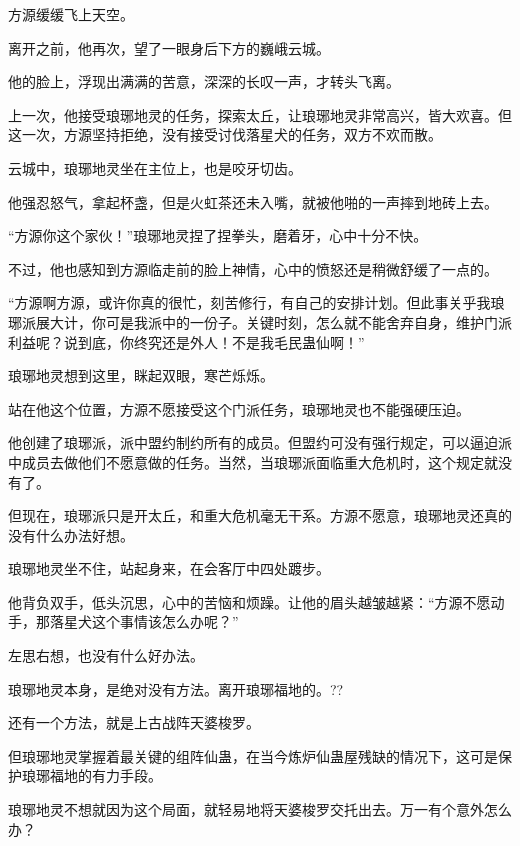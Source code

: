 
\begin{this_body}



方源缓缓飞上天空。

离开之前，他再次，望了一眼身后下方的巍峨云城。

他的脸上，浮现出满满的苦意，深深的长叹一声，才转头飞离。

上一次，他接受琅琊地灵的任务，探索太丘，让琅琊地灵非常高兴，皆大欢喜。但这一次，方源坚持拒绝，没有接受讨伐落星犬的任务，双方不欢而散。

云城中，琅琊地灵坐在主位上，也是咬牙切齿。

他强忍怒气，拿起杯盏，但是火虹茶还未入嘴，就被他啪的一声摔到地砖上去。

“方源你这个家伙！”琅琊地灵捏了捏拳头，磨着牙，心中十分不快。

不过，他也感知到方源临走前的脸上神情，心中的愤怒还是稍微舒缓了一点的。

“方源啊方源，或许你真的很忙，刻苦修行，有自己的安排计划。但此事关乎我琅琊派展大计，你可是我派中的一份子。关键时刻，怎么就不能舍弃自身，维护门派利益呢？说到底，你终究还是外人！不是我毛民蛊仙啊！”

琅琊地灵想到这里，眯起双眼，寒芒烁烁。

站在他这个位置，方源不愿接受这个门派任务，琅琊地灵也不能强硬压迫。

他创建了琅琊派，派中盟约制约所有的成员。但盟约可没有强行规定，可以逼迫派中成员去做他们不愿意做的任务。当然，当琅琊派面临重大危机时，这个规定就没有了。

但现在，琅琊派只是开太丘，和重大危机毫无干系。方源不愿意，琅琊地灵还真的没有什么办法好想。

琅琊地灵坐不住，站起身来，在会客厅中四处踱步。

他背负双手，低头沉思，心中的苦恼和烦躁。让他的眉头越皱越紧：“方源不愿动手，那落星犬这个事情该怎么办呢？”

左思右想，也没有什么好办法。

琅琊地灵本身，是绝对没有方法。离开琅琊福地的。??

还有一个方法，就是上古战阵天婆梭罗。

但琅琊地灵掌握着最关键的组阵仙蛊，在当今炼炉仙蛊屋残缺的情况下，这可是保护琅琊福地的有力手段。

琅琊地灵不想就因为这个局面，就轻易地将天婆梭罗交托出去。万一有个意外怎么办？


\end{this_body}
